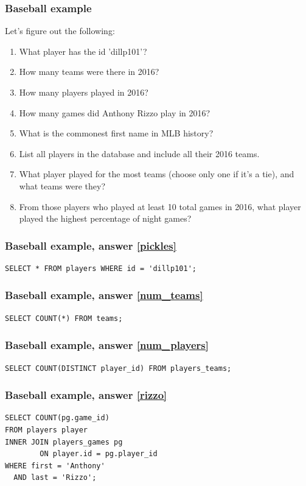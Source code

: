 \documentclass[aspectratio=169]{beamer}
\begin{document}
\begin{frame}[fragile]
  \frametitle{Baseball example}
  Let's figure out the following:

  \begin{enumerate}
    \item What player has the id 'dillp101'?\label{pickles}
    \item How many teams were there in 2016?\label{num_teams}
    \item How many players played in 2016?\label{num_players}
    \item How many games did Anthony Rizzo play in 2016?\label{rizzo}
    \item What is the commonest first name in MLB history?\label{common}
    \item List all players in the database and include all their 2016
          teams.\label{all_teams}
    \item What player played for the most teams (choose only one if it's a
          tie), and what teams were they?\label{most_teams}
    \item From those players who played at least 10 total games in 2016, what
          player played the highest percentage of night games?\label{night}
  \end{enumerate}
\end{frame}

\begin{frame}[fragile]
  \frametitle{Baseball example, answer \ref{pickles}}
  \begin{lstlisting}
SELECT * FROM players WHERE id = 'dillp101';
  \end{lstlisting}
\end{frame}

\begin{frame}[fragile]
  \frametitle{Baseball example, answer \ref{num_teams}}
  \begin{lstlisting}
SELECT COUNT(*) FROM teams;
  \end{lstlisting}
\end{frame}

\begin{frame}[fragile]
  \frametitle{Baseball example, answer \ref{num_players}}
  \begin{lstlisting}
SELECT COUNT(DISTINCT player_id) FROM players_teams;
  \end{lstlisting}
\end{frame}

\begin{frame}[fragile]
  \frametitle{Baseball example, answer \ref{rizzo}}
  \begin{lstlisting}
SELECT COUNT(pg.game_id)
FROM players player
INNER JOIN players_games pg
        ON player.id = pg.player_id
WHERE first = 'Anthony'
  AND last = 'Rizzo';
  \end{lstlisting}
\end{frame}
\end{document}
